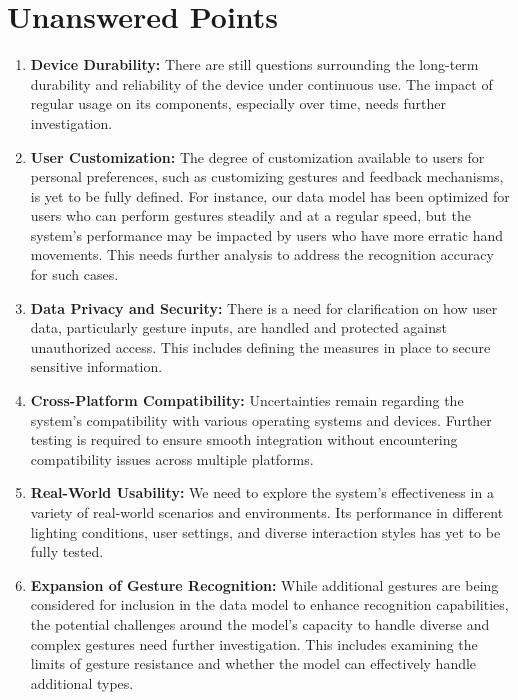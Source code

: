 \section{Unanswered Points}

\begin{enumerate}
	\item \textbf{Device Durability:} 
	There are still questions surrounding the long-term durability and reliability of the device under continuous use. The impact of regular usage on its components, especially over time, needs further investigation.
	
	\item \textbf{User Customization:} 
	The degree of customization available to users for personal preferences, such as customizing gestures and feedback mechanisms, is yet to be fully defined. For instance, our data model has been optimized for users who can perform gestures steadily and at a regular speed, but the system’s performance may be impacted by users who have more erratic hand movements. This needs further analysis to address the recognition accuracy for such cases.
	
	\item \textbf{Data Privacy and Security:} 
	There is a need for clarification on how user data, particularly gesture inputs, are handled and protected against unauthorized access. This includes defining the measures in place to secure sensitive information.
	
	\item \textbf{Cross-Platform Compatibility:} 
	Uncertainties remain regarding the system’s compatibility with various operating systems and devices. Further testing is required to ensure smooth integration without encountering compatibility issues across multiple platforms.
	
	\item \textbf{Real-World Usability:} 
	We need to explore the system’s effectiveness in a variety of real-world scenarios and environments. Its performance in different lighting conditions, user settings, and diverse interaction styles has yet to be fully tested.
	
	\item \textbf{Expansion of Gesture Recognition:} 
	While additional gestures are being considered for inclusion in the data model to enhance recognition capabilities, the potential challenges around the model's capacity to handle diverse and complex gestures need further investigation. This includes examining the limits of gesture resistance and whether the model can effectively handle additional types.
\end{enumerate}

